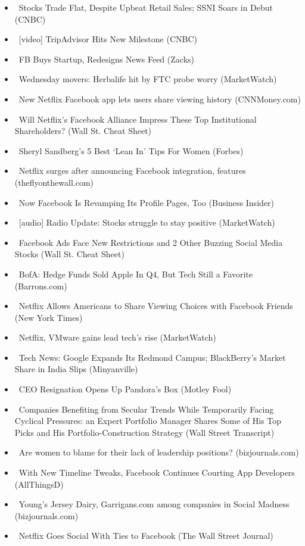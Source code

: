 \documentclass[11pt,asymmetric]{article}
\begin{document}
\begin{itemize}
\item\ Stocks Trade Flat, Despite Upbeat Retail Sales; SSNI Soars in Debut (CNBC)
\item\ [video] TripAdvisor Hits New Milestone (CNBC)
\item\ FB Buys Startup, Redesigns News Feed (Zacks)
\item\ Wednesday movers: Herbalife hit by FTC probe worry (MarketWatch)
\item\ New Netflix Facebook app lets users share viewing history (CNNMoney.com)
\item\ Will Netflix’s Facebook Alliance Impress These Top Institutional Shareholders? (Wall St. Cheat Sheet)
\item\ Sheryl Sandberg's 5 Best `Lean In' Tips For Women (Forbes)
\item\ Netflix surges after announcing Facebook integration, features (theflyonthewall.com)
\item\ Now Facebook Is Revamping Its Profile Pages, Too (Business Insider)
\item\ [audio] Radio Update: Stocks struggle to stay positive (MarketWatch)
\item\ Facebook Ads Face New Restrictions and 2 Other Buzzing Social Media Stocks (Wall St. Cheat Sheet)
\item\ BofA: Hedge Funds Sold Apple In Q4, But Tech Still a Favorite (Barrons.com)
\item\ Netflix Allows Americans to Share Viewing Choices with Facebook Friends (New York Times)
\item\ Netflix, VMware gains lead tech’s rise (MarketWatch)
\item\ Tech News: Google Expands Its Redmond Campus; BlackBerry's Market Share in India Slips (Minyanville)
\item\ CEO Resignation Opens Up Pandora’s Box (Motley Fool)
\item\ Companies Benefiting from Secular Trends While Temporarily Facing Cyclical Pressures: an Expert Portfolio Manager Shares Some of His Top Picks and His Portfolio-Construction Strategy (Wall Street Transcript)
\item\ Are women to blame for their lack of leadership positions? (bizjournals.com)
\item\ With New Timeline Tweaks, Facebook Continues Courting App Developers (AllThingsD)
\item\ Young's Jersey Dairy, Garrigans.com among companies in Social Madness (bizjournals.com)
\item\ Netflix Goes Social With Ties to Facebook (The Wall Street Journal)

\end{itemize}
\end{document}
